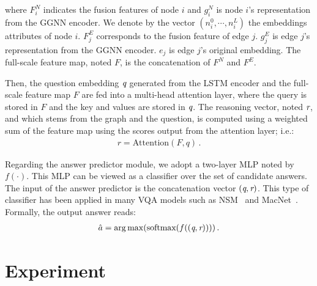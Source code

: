 \documentclass[letterpaper]{article} %
\begin{document}
where $F_i^N$ indicates the fusion features of node $i$ and $g_i^N$ is node $i$'s representation from the GGNN encoder. 
We denote by the vector $(n_i^0, \cdots,n_i^L)$ the embeddings attributes of node $i$. 
$F_j^E$ corresponds to the fusion feature of edge $j$. $g_j^E$ is edge $j$'s representation from the GGNN encoder. $e_j$ is edge $j$'s original embedding. 
The full-scale feature map, noted $F$, is the concatenation of $F^N$ and $F^E$.

Then, the question embedding $\emph{q}$ generated from the LSTM encoder and the full-scale feature map $F$ are fed into a multi-head attention layer, where the query is stored in $F$ and the key and values are stored in $\emph{q}$.
The reasoning vector, noted $\emph{r}$, and which stems from the graph and the question, is computed using a weighted sum of the feature map using the scores output from the attention layer; i.e.:
\begin{gather}
    r = \text{Attention}(F, q) \, .
\end{gather}

Regarding the answer predictor module, we adopt a two-layer MLP noted by $f(\cdot)$. 
This MLP can be viewed as a classifier over the set of candidate answers. 
The input of the answer predictor is the concatenation vector $(\emph{q},\emph{r})$. 
This type of classifier has been applied in many VQA models such as NSM~\cite{DBLP:conf/nips/HudsonM19} and MacNet~\cite{DBLP:conf/nips/LuYBP16}.
Formally, the output answer reads:
\begin{gather}
    \hat{a} = \mathop{\arg\max}(\text{softmax}(f((\emph{q},\emph{r}))))\, .
\end{gather}



\section{Experiment}\label{sec:experiments}
\end{document}
